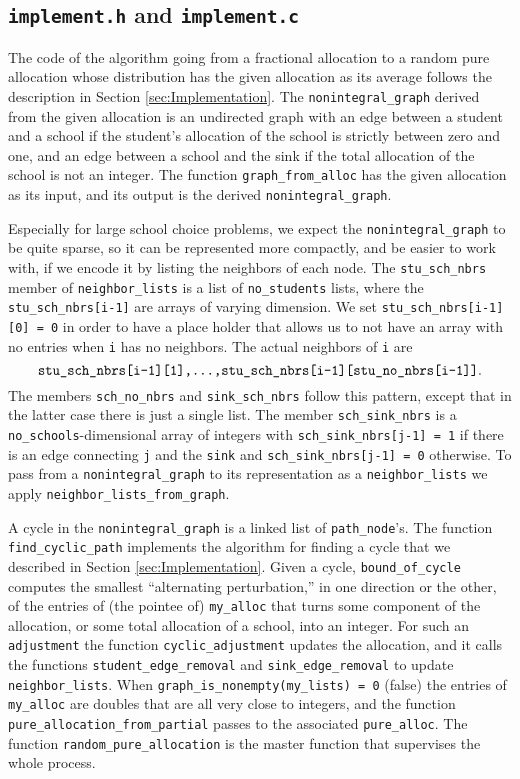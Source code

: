 \documentclass[12pt]{article}
\theoremstyle{definition}
\begin{document}
\begin{appendix}
\subsection{\texttt{implement.h} and \texttt{implement.c}}

The code of the algorithm going from a fractional allocation to a
random pure allocation whose distribution has the given allocation as
its average follows the description in Section
\ref{sec:Implementation}.  The \texttt{nonintegral\_graph} derived
from the given allocation is an undirected graph with an edge between
a student and a school if the student's allocation of the school is
strictly between zero and one, and an edge between a school and the
sink if the total allocation of the school is not an integer.  The
function \texttt{graph\_from\_alloc} has the given allocation as its
input, and its output is the derived \texttt{nonintegral\_graph}.

Especially for large school choice problems, we expect the
\texttt{nonintegral\_graph} to be quite sparse, so it can be
represented more compactly, and be easier to work with, if we encode
it by listing the neighbors of each node.  The \texttt{stu\_sch\_nbrs}
member of \texttt{neighbor\_lists} is a list of \texttt{no\_students}
lists, where the \texttt{stu\_sch\_nbrs[i-1]} are arrays of varying
dimension. We set \texttt{stu\_sch\_nbrs[i-1][0] = 0} in order to have
a place holder that allows us to not have an array with no entries
when \texttt{i} has no neighbors.  The actual neighbors of \texttt{i}
are
$$\text{\texttt{stu\_sch\_nbrs[i-1][1],...,stu\_sch\_nbrs[i-1][stu\_no\_nbrs[i-1]]}}.$$
The members \texttt{sch\_no\_nbrs} and \texttt{sink\_sch\_nbrs} follow
this pattern, except that in the latter case there is just a single
list.  The member \texttt{sch\_sink\_nbrs} is a
\texttt{no\_schools}-dimensional array of integers with
\texttt{sch\_sink\_nbrs[j-1] = 1} if there is an edge connecting
\texttt{j} and the \texttt{sink} and \texttt{sch\_sink\_nbrs[j-1] = 0}
otherwise.  To pass from a \texttt{nonintegral\_graph} to its
representation as a \texttt{neighbor\_lists} we apply
\texttt{neighbor\_lists\_from\_graph}.

A cycle in the \texttt{nonintegral\_graph} is a linked list of
\texttt{path\_node}'s.  The function \texttt{find\_cyclic\_path}
implements the algorithm for finding a cycle that we described in
Section \ref{sec:Implementation}.  Given a cycle,
\texttt{bound\_of\_cycle} computes the smallest ``alternating
perturbation,'' in one direction or the other, of the entries of (the
pointee of) \texttt{my\_alloc} that turns some component of the
allocation, or some total allocation of a school, into an integer.
For such an \texttt{adjustment} the function
\texttt{cyclic\_adjustment} updates the allocation, and it calls the
functions \texttt{student\_edge\_removal} and
\texttt{sink\_edge\_removal} to update \texttt{neighbor\_lists}.
When \texttt{graph\_is\_nonempty(my\_lists) = 0} (false) the entries
of \texttt{my\_alloc} are doubles that are all very close to integers,
and the function \texttt{pure\_allocation\_from\_partial} passes to
the associated \texttt{pure\_alloc}.  The function
\texttt{random\_pure\_allocation} is the master function that
supervises the whole process.


\end{appendix}
\end{document}
